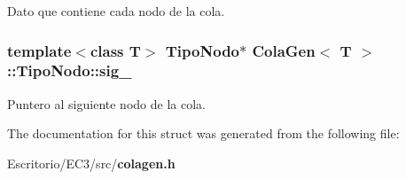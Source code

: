 Dato que contiene cada nodo de la cola. 

\subsubsection{\setlength{\rightskip}{0pt plus 5cm}template$<$class T$>$ {\bf TipoNodo}$\ast$ {\bf ColaGen}$<$ T $>$::{\bf TipoNodo::sig\_\-}}\label{structColaGen_1_1TipoNodo_db913cdcb6ac7d1f6d2ce4c8ebc06300}


Puntero al siguiente nodo de la cola. 



The documentation for this struct was generated from the following file:\begin{CompactItemize}
\item 
Escritorio/EC3/src/{\bf colagen.h}\end{CompactItemize}
